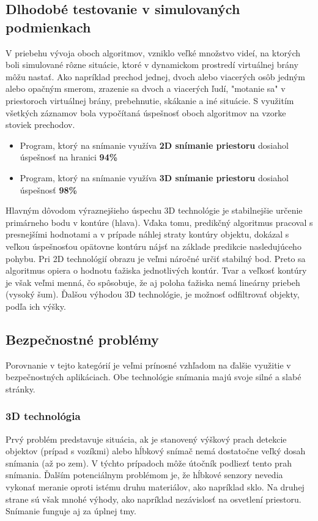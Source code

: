 \subsection{Dlhodobé testovanie v simulovaných podmienkach}
V priebehu vývoja oboch algoritmov, vzniklo veľké množstvo videí, na ktorých boli simulované rôzne situácie, ktoré v dynamickom prostredí virtuálnej brány môžu nastať. Ako napríklad prechod jednej, dvoch alebo viacerých osôb jedným alebo opačným smerom, zrazenie sa dvoch a viacerých ľudí, "motanie sa" v priestoroch virtuálnej brány, prebehnutie, skákanie a iné situácie. S využitím všetkých záznamov bola vypočítaná úspešnosť oboch algoritmov na vzorke stoviek prechodov.    

\begin{itemize}
\item Program, ktorý na snímanie využíva \textbf{2D snímanie priestoru} dosiahol úspešnosť na hranici \textbf{94\%}
\item Program, ktorý na snímanie využíva \textbf{3D snímanie priestoru} dosiahol úspešnosť \textbf{98\%}
\end{itemize}

Hlavným dôvodom výraznejšieho úspechu 3D technológie je stabilnejšie určenie primárneho bodu v kontúre (hlava). Vďaka tomu, predikčný algoritmus pracoval s presnejšími hodnotami a v prípade náhlej straty kontúry objektu, dokázal s veľkou úspešnosťou opätovne kontúru nájsť na základe predikcie nasledujúceho pohybu. Pri 2D technológií obrazu je veľmi náročné určiť stabilný bod. Preto sa algoritmus opiera o hodnotu ťažiska jednotlivých kontúr. Tvar a veľkosť kontúry je však veľmi menná, čo spôsobuje, že aj poloha ťažiska nemá lineárny priebeh (vysoký šum). Ďalšou výhodou 3D technológie, je možnosť odfiltrovať objekty, podľa ich výšky.

\vspace{5mm}


\subsection{Bezpečnostné problémy}
Porovnanie v tejto kategórií je veľmi prínosné vzhľadom na ďalšie využitie v bezpečnostných aplikáciach. Obe technológie snímania majú svoje silné a slabé stránky.

\subsubsection{3D technológia}
Prvý problém predstavuje situácia, ak je stanovený výškový prach detekcie objektov (prípad s vozíkmi) alebo hĺbkový snímač nemá dostatočne veľký dosah snímania (až po zem). V týchto prípadoch môže útočník podliezť tento prah snímania. Ďalším potenciálnym problémom je, že hĺbkové senzory nevedia vykonať meranie oproti istému druhu materiálov, ako napríklad sklo. Na druhej strane sú však mnohé výhody, ako napríklad  nezávislosť na osvetlení priestoru. Snímanie funguje aj za úplnej tmy. 

